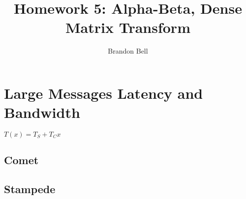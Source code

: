 \documentclass{IEEEtran}
\begin{document}
\title{Homework 5: Alpha-Beta, Dense Matrix Transform}
\author{Brandon Bell}
\maketitle
\begin{abstract}
\end{abstract}

\section{Large Messages Latency and Bandwidth}
$T(x) = T_S + T_C x $

\subsection{Comet}
 \begin{figure}
        \caption{ }
\end{figure}

 \begin{figure}
        \caption{ }
\end{figure}

 \begin{figure}
        \caption{ }
\end{figure}

\subsection{Stampede}
 \begin{figure}
        \caption{ }
\end{figure}

 \begin{figure}
        \caption{ }
\end{figure}

 \begin{figure}
        \caption{ }
\end{figure}
\end{document}

